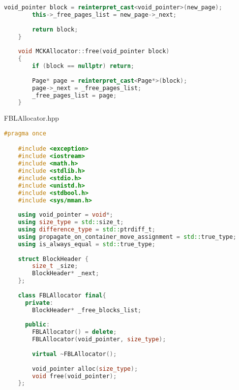 \documentclass[a4paper, 12pt]{article}
\begin{document}
\begin{lstlisting}[language=C++]
        void_pointer block = reinterpret_cast<void_pointer>(new_page);
        this->_free_pages_list = new_page->_next;
    
        return block;
    }
    
    void MCKAllocator::free(void_pointer block)
    {
        if (block == nullptr) return;
    
        Page* page = reinterpret_cast<Page*>(block);
        page->_next = _free_pages_list;
        _free_pages_list = page;
    }
\end{lstlisting}

FBLAllocator.hpp
\begin{lstlisting}[language=C++]
    #pragma once

    #include <exception>
    #include <iostream>
    #include <math.h>
    #include <stdlib.h>
    #include <stdio.h>
    #include <unistd.h>
    #include <stdbool.h>
    #include <sys/mman.h>
    
    using void_pointer = void*;
    using size_type = std::size_t;
    using difference_type = std::ptrdiff_t;
    using propagate_on_container_move_assignment = std::true_type;
    using is_always_equal = std::true_type;
    
    struct BlockHeader {
        size_t _size;
        BlockHeader* _next;
    };
    
    class FBLAllocator final{
      private:
        BlockHeader* _free_blocks_list;
    
      public:
        FBLAllocator() = delete;
        FBLAllocator(void_pointer, size_type);
    
        virtual ~FBLAllocator();
    
        void_pointer alloc(size_type);
        void free(void_pointer);
    };
\end{lstlisting}
\end{document}
